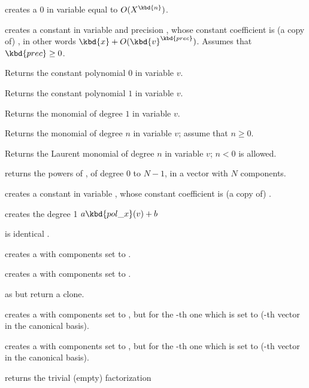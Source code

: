  creates a $0$  in variable
 equal to $O(X^\kbd{n})$.

 creates a constant 
in variable  and precision , whose constant coefficient is
(a copy of) , in other words $\kbd{x} + O(\kbd{v}^\kbd{prec})$.
Assumes that $\kbd{prec}\geq 0$.

 Returns the constant polynomial $0$ in variable $v$.

 Returns the constant polynomial $1$ in variable $v$.

 Returns the monomial of degree $1$ in variable $v$.

 Returns the monomial of degree $n$
in variable $v$; assume that $n \geq 0$.

 Returns the Laurent monomial of degree $n$
in variable $v$; $n < 0$ is allowed.

 returns the powers of
, of degree $0$ to $N-1$, in a vector with $N$ components.

 creates a constant  in variable
, whose constant coefficient is (a copy of) .

 creates the degree 1 
$a \kbd{pol\_x}(v) + b$

 is identical .

 creates a  with  components set to
.

 creates a  with  components set to
.

 as  but return a clone.

 creates a  with  components
set to , but for the -th one which is set to 
(-th vector in the canonical basis).

 creates a  with  components
set to , but for the -th one which is set to 
(-th vector in the canonical basis).

 returns the trivial (empty) factorization

